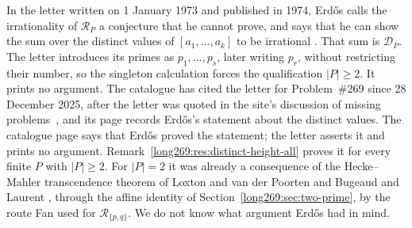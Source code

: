 \documentclass[11pt]{article}
\theoremstyle{remark}
\theoremstyle{plain}
\begin{document}
In the letter written on 1 January 1973 and published in 1974, Erd\H{o}s
calls the irrationality of $\mathcal R_P$ a conjecture that he cannot prove,
and says that he can show the sum over the distinct values of
$[a_1,\ldots,a_k]$ to be irrational \cite[p.~335]{erdos1974letter}.  That
sum is $\mathcal D_P$.  The letter introduces its primes as $p_1,\ldots,p_s$,
later writing $p_r$, without restricting their number, so the singleton
calculation forces the qualification $|P|\ge2$.  It prints no argument.  The
catalogue has cited the letter for Problem~\#269 since 28 December 2025,
after the letter was quoted in the site's discussion of missing
problems~\cite{erdosproblemsmissing}, and its page records Erd\H{o}s's
statement about the distinct values.
The catalogue page says that Erd\H{o}s proved the statement; the letter
asserts it and prints no argument.
Remark~\ref{long269:res:distinct-height-all} proves it for every finite
$P$ with $|P|\ge2$.  For $|P|=2$ it was already a consequence of the
Hecke--Mahler transcendence theorem of Loxton and van der Poorten
\cite[Theorem~8, p.~40]{loxtonvdp1977} and Bugeaud and Laurent
\cite[Theorem~1.1]{bugeaudlaurent2023}, through the affine identity of
Section~\ref{long269:sec:two-prime}, by the route Fan used for
$\mathcal R_{\{p,q\}}$.  We do not know what
argument Erd\H{o}s had in mind.
\end{document}
